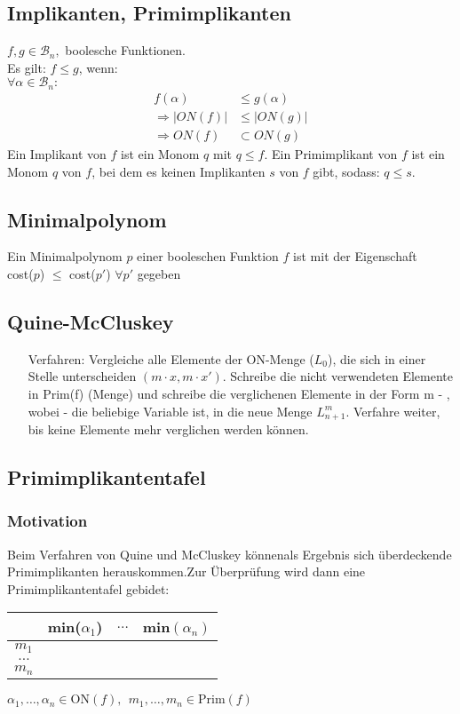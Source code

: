 \documentclass{scrartcl}[10pt]
\begin{document}
\subsection{Implikanten, Primimplikanten}
$f,g \in \mathcal{B}_n,$ boolesche Funktionen.\\
Es gilt: $f\leq g$, wenn:\\
$\forall \alpha \in \mathcal{B}_n:$
\begin{align*}
f(\alpha) &\leq g(\alpha)\\
 \Rightarrow |ON(f)| &\leq |ON(g)| \\
 \Rightarrow ON(f) &\subset ON(g)
 \end{align*}
Ein Implikant von $f$ ist ein Monom $q$ mit $q \leq f$. Ein Primimplikant von $f$ ist ein Monom $q$ von $f$, bei dem es keinen Implikanten $s$ von $f$ gibt, sodass: $q \leq s$.
\subsection{Minimalpolynom}
Ein Minimalpolynom $p$ einer booleschen Funktion $f$ ist mit der Eigenschaft \\ cost($p$) $\leq$ cost($p'$) $\forall p'$ gegeben
\subsection{Quine-McCluskey}
\begin{itemize}
\item[Verfahren:]Vergleiche alle Elemente der ON-Menge ($L_0$), die sich in einer Stelle unterscheiden $(m \cdot x, m \cdot x')$. Schreibe die nicht verwendeten Elemente in Prim(f) (Menge) und schreibe die verglichenen Elemente in der Form m - , wobei - die beliebige Variable ist, in die neue Menge $L_{n+1}^{m}$. Verfahre weiter, bis keine Elemente mehr verglichen werden k\"onnen.
\end{itemize}
\newpage
\subsection{Primimplikantentafel}
\subsubsection{Motivation}
Beim Verfahren von Quine und McCluskey k\"onnenals Ergebnis sich \"uberdeckende Primimplikanten herauskommen.Zur \"Uberpr\"ufung wird dann eine Primimplikantentafel gebidet:
\begin{tabular}{c|ccc}
 & min($\alpha_1$) & $\dots$ & min$(\alpha_n)$\\ \hline
 $m_1$\\
 $\dots$\\
 $m_n$
\end{tabular}$\alpha_1, \dots, \alpha_n \in \text{ON}(f), \ \ m_1, \dots, m_n \in \text{Prim}(f)$
\end{document}
